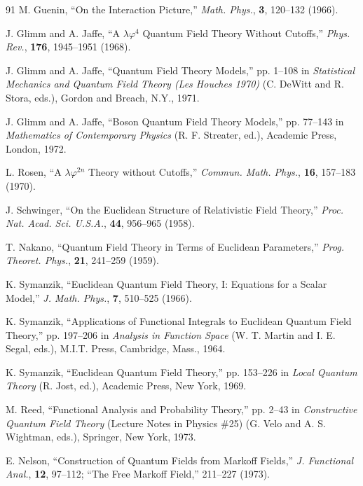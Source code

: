 \begin{thebibliography}{91}
M. Guenin, ``On the Interaction Picture,'' \emph{Math. Phys.}, \textbf{3},
120--132 (1966).

J. Glimm and A. Jaffe, ``A $\lambda\varphi^4$ Quantum Field Theory Without
Cutoffs,'' \emph{Phys. Rev.}, \textbf{176}, 1945--1951 (1968).

J. Glimm and A. Jaffe, ``Quantum Field Theory Models,'' pp. 1--108 in
\emph{Statistical Mechanics and Quantum Field Theory (Les Houches 1970)}
(C. DeWitt and R. Stora, eds.), Gordon and Breach, N.Y., 1971.

J. Glimm and A. Jaffe, ``Boson Quantum Field Theory Models,'' pp. 77--143 in
\emph{Mathematics of Contemporary Physics} (R. F. Streater, ed.), Academic
Press, London, 1972.

L. Rosen, ``A $\lambda\varphi^{2n}$ Theory without Cutoffs,'' \emph{Commun.
Math. Phys.}, \textbf{16}, 157--183 (1970).

J. Schwinger, ``On the Euclidean Structure of Relativistic Field Theory,''
\emph{Proc. Nat. Acad. Sci. U.S.A.}, \textbf{44}, 956--965 (1958).

T. Nakano, ``Quantum Field Theory in Terms of Euclidean Parameters,''
\emph{Prog. Theoret. Phys.}, \textbf{21}, 241--259 (1959).

K. Symanzik, ``Euclidean Quantum Field Theory, I: Equations for a Scalar
Model,'' \emph{J. Math. Phys.}, \textbf{7}, 510--525 (1966).

K. Symanzik, ``Applications of Functional Integrals to Euclidean Quantum
Field Theory,'' pp. 197--206 in \emph{Analysis in Function Space} (W. T.
Martin and I. E. Segal, eds.), M.I.T. Press, Cambridge, Mass., 1964.

K. Symanzik, ``Euclidean Quantum Field Theory,'' pp. 153--226 in \emph{Local
Quantum Theory} (R. Jost, ed.), Academic Press, New York, 1969.

M. Reed, ``Functional Analysis and Probability Theory,'' pp. 2--43 in
\emph{Constructive Quantum Field Theory} (Lecture Notes in Physics \#25)
(G. Velo and A. S. Wightman, eds.), Springer, New York, 1973.

E. Nelson, ``Construction of Quantum Fields from Markoff Fields,'' \emph{J.
Functional Anal.}, \textbf{12}, 97--112; ``The Free Markoff Field,'' 211--227
(1973).


\end{thebibliography}

